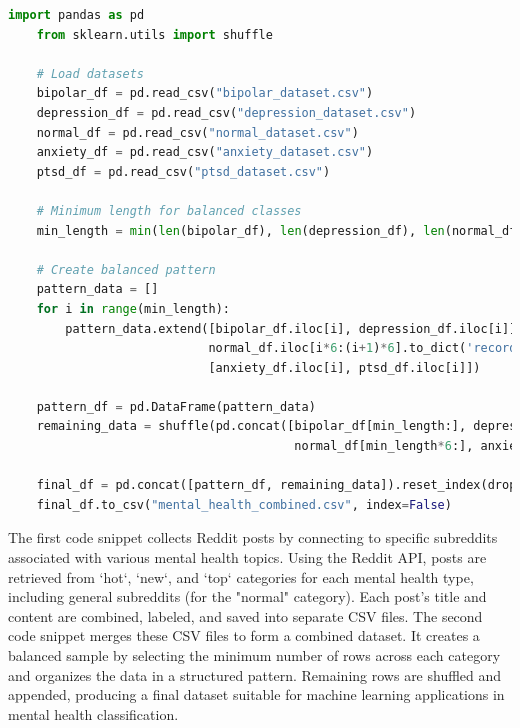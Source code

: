    \begin{tcolorbox}[colback=gray!5!white, colframe=gray!80!black, boxrule=0.5pt, title=Combining Collected Datasets]
    \begin{lstlisting}[language=Python]
    import pandas as pd
    from sklearn.utils import shuffle
    
    # Load datasets
    bipolar_df = pd.read_csv("bipolar_dataset.csv")
    depression_df = pd.read_csv("depression_dataset.csv")
    normal_df = pd.read_csv("normal_dataset.csv")
    anxiety_df = pd.read_csv("anxiety_dataset.csv")
    ptsd_df = pd.read_csv("ptsd_dataset.csv")
    
    # Minimum length for balanced classes
    min_length = min(len(bipolar_df), len(depression_df), len(normal_df) // 6, len(anxiety_df), len(ptsd_df))
    
    # Create balanced pattern
    pattern_data = []
    for i in range(min_length):
        pattern_data.extend([bipolar_df.iloc[i], depression_df.iloc[i]] +
                            normal_df.iloc[i*6:(i+1)*6].to_dict('records') +
                            [anxiety_df.iloc[i], ptsd_df.iloc[i]])
    
    pattern_df = pd.DataFrame(pattern_data)
    remaining_data = shuffle(pd.concat([bipolar_df[min_length:], depression_df[min_length:], 
                                        normal_df[min_length*6:], anxiety_df[min_length:], ptsd_df[min_length:]]))
    
    final_df = pd.concat([pattern_df, remaining_data]).reset_index(drop=True)
    final_df.to_csv("mental_health_combined.csv", index=False)
    \end{lstlisting}
    \end{tcolorbox}
    
    \noindent
    The first code snippet collects Reddit posts by connecting to specific subreddits associated with various mental health topics. Using the Reddit API, posts are retrieved from `hot`, `new`, and `top` categories for each mental health type, including general subreddits (for the "normal" category). Each post’s title and content are combined, labeled, and saved into separate CSV files. The second code snippet merges these CSV files to form a combined dataset. It creates a balanced sample by selecting the minimum number of rows across each category and organizes the data in a structured pattern. Remaining rows are shuffled and appended, producing a final dataset suitable for machine learning applications in mental health classification.
    

